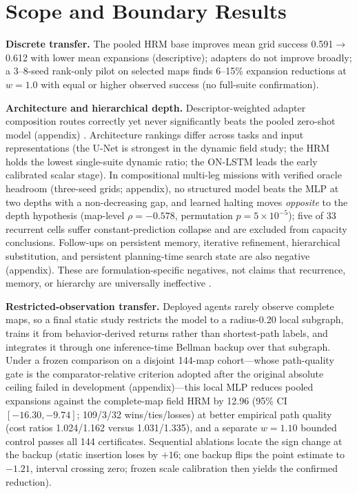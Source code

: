 \documentclass[letterpaper]{article} %
\begin{document}
\section{Scope and Boundary Results}

\textbf{Discrete transfer.} The pooled HRM base improves mean grid success 0.591$\to$0.612 with lower mean expansions (descriptive); adapters do not improve broadly; a 3--8-seed rank-only pilot on selected maps finds 6--15\% expansion reductions at $w{=}1.0$ with equal or higher observed success (no full-suite confirmation).

\textbf{Architecture and hierarchical depth.} Descriptor-weighted adapter composition routes correctly yet never significantly beats the pooled zero-shot model (appendix) \citep{wortsman2022soups,ilharco2022task}. Architecture rankings differ across tasks and input representations (the U-Net is strongest in the dynamic field study; the HRM holds the lowest single-suite dynamic ratio; the ON-LSTM leads the early calibrated scalar stage). In compositional multi-leg missions with verified oracle headroom (three-seed grids; appendix), no structured model beats the MLP at two depths with a non-decreasing gap, and learned halting moves \emph{opposite} to the depth hypothesis (map-level $\rho{=}-0.578$, permutation $p{=}5\times10^{-5}$); five of 33 recurrent cells suffer constant-prediction collapse and are excluded from capacity conclusions. Follow-ups on persistent memory, iterative refinement, hierarchical substitution, and persistent planning-time search state are also negative (appendix). These are formulation-specific negatives, not claims that recurrence, memory, or hierarchy are universally ineffective \citep{jolicoeur2025trm,czechowski2021subgoal}.

\textbf{Restricted-observation transfer.} Deployed agents rarely observe complete maps, so a final static study restricts the model to a radius-0.20 local subgraph, trains it from behavior-derived returns rather than shortest-path labels, and integrates it through one inference-time Bellman backup over that subgraph. Under a frozen comparison on a disjoint 144-map cohort---whose path-quality gate is the comparator-relative criterion adopted after the original absolute ceiling failed in development (appendix)---this local MLP reduces pooled expansions against the complete-map field HRM by 12.96 (95\% CI $[-16.30,-9.74]$; 109/3/32 wins/ties/losses) at better empirical path quality (cost ratios 1.024/1.162 versus 1.031/1.335), and a separate $w{=}1.10$ bounded control passes all 144 certificates. Sequential ablations locate the sign change at the backup (static insertion loses by $+16$; one backup flips the point estimate to $-1.21$, interval crossing zero; frozen scale calibration then yields the confirmed reduction).
\end{document}

